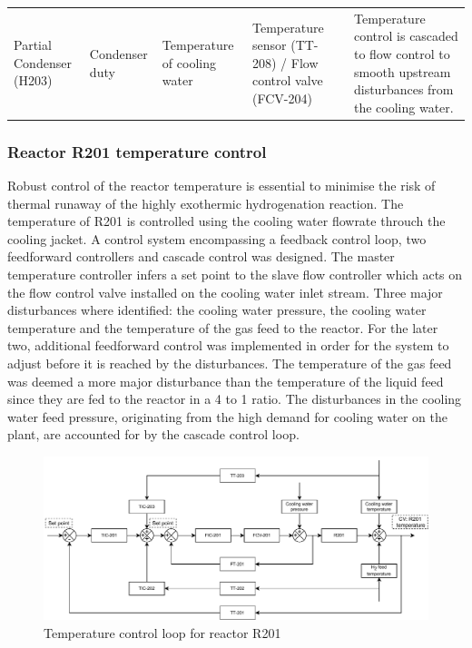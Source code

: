 \begin{table}[h]
{\begin{tabular}{p{3cm}|p{3cm}|p{4cm}|p{5cm}|p{6cm}}
                                            &                                             &                                                         &                                                                            &                                                                                                                                      \\ \midrule
Partial Condenser (H203)                    & Condenser duty                              & Temperature of cooling water                            & Temperature sensor (TT-208) / Flow control valve (FCV-204)                 & Temperature control is cascaded to flow control to smooth upstream   disturbances from the cooling water.                            \\ \bottomrule
\end{tabular}}
\end{table}


\subsubsection{Reactor R201 temperature control} %
Robust control of the reactor temperature is essential to minimise the risk of thermal runaway of the highly exothermic hydrogenation reaction. The temperature of R201 is controlled using the cooling water flowrate throuch the cooling jacket. A control system encompassing a feedback control loop, two feedforward controllers and cascade control was designed. The master temperature controller infers a set point to the slave flow controller which acts on the flow control valve installed on the cooling water inlet stream. Three major disturbances where identified: the cooling water pressure, the cooling water temperature and the temperature of the gas feed to the reactor. For the later two, additional feedforward control was implemented in order for the system to adjust before it is reached by the disturbances. The temperature of the gas feed was deemed a more major disturbance than the temperature of the liquid feed since they are fed to the reactor in a 4 to 1 ratio. The disturbances in the cooling water feed pressure, originating from the high demand for cooling water on the plant, are accounted for by the cascade control loop.

\begin{figure}[h]
    \centering
    \includegraphics[width=0.8\linewidth]{chapters/4-operation-control/4-Figures/R201-TC.pdf}
    \caption{Temperature control loop for reactor R201}
    \label{fig:R201-TC}
\end{figure}

